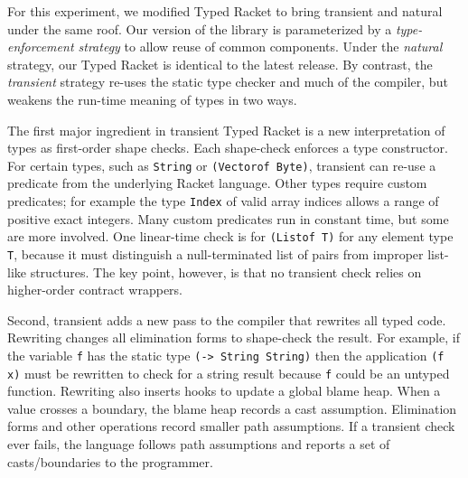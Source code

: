 For this experiment, we modified Typed Racket to bring transient and natural
 under the same roof.
Our version of the library is parameterized by a \emph{type-enforcement strategy}
 to allow reuse of common components.
Under the \emph{natural} strategy, our Typed Racket is identical to the latest release.
By contrast, the \emph{transient} strategy re-uses the static type checker and
 much of the compiler, but weakens the run-time meaning of types in two ways.

The first major ingredient in transient Typed Racket is a new interpretation
 of types as first-order shape checks.
Each shape-check enforces a type constructor.
For certain types, such as {\tt String} or {\tt (Vectorof Byte)}, transient can
 re-use a predicate from the underlying Racket language.
Other types require custom predicates; for example the type {\tt Index} of
 valid array indices allows a range of positive exact integers.
Many custom predicates run in constant time, but some are more involved.
One linear-time check is for {\tt (Listof T)} for any element type {\tt T},
 because it must distinguish a null-terminated list of pairs from improper
 list-like structures.
The key point, however, is that no transient check relies on
 higher-order contract wrappers.

Second, transient adds a new pass to the compiler that rewrites all typed code.
Rewriting changes all elimination forms to shape-check the result.
For example, if the variable {\tt f} has the static type {\tt (-> String String)}
 then the application {\tt (f x)} must be rewritten to check for a string result
 because {\tt f} could be an untyped function.
Rewriting also inserts hooks to update a global blame heap.
When a value crosses a boundary, the blame heap records a cast assumption.
Elimination forms and other operations record smaller path assumptions.
If a transient check ever fails, the language follows path assumptions and
 reports a set of casts/boundaries to the programmer.



